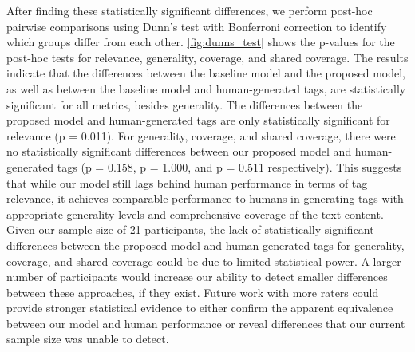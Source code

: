 After finding these statistically significant differences, we perform post-hoc pairwise comparisons using Dunn's test with Bonferroni correction to identify which groups differ from each other. \cref{fig:dunns_test} shows the p-values for the post-hoc tests for relevance, generality, coverage, and shared coverage. The results indicate that the differences between the baseline model and the proposed model, as well as between the baseline model and human-generated tags, are statistically significant for all metrics, besides generality. The differences between the proposed model and human-generated tags are only statistically significant for relevance (p = 0.011). For generality, coverage, and shared coverage, there were no statistically significant differences between our proposed model and human-generated tags (p = 0.158, p = 1.000, and p = 0.511 respectively). This suggests that while our model still lags behind human performance in terms of tag relevance, it achieves comparable performance to humans in generating tags with appropriate generality levels and comprehensive coverage of the text content. Given our sample size of 21 participants, the lack of statistically significant differences between the proposed model and human-generated tags for generality, coverage, and shared coverage could be due to limited statistical power. A larger number of participants would increase our ability to detect smaller differences between these approaches, if they exist. Future work with more raters could provide stronger statistical evidence to either confirm the apparent equivalence between our model and human performance or reveal differences that our current sample size was unable to detect.

